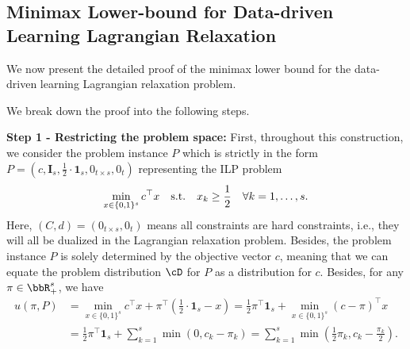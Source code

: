 \subsection{Minimax Lower-bound for Data-driven Learning Lagrangian Relaxation} \label{sec:app-minimax}

We now present the detailed proof of the minimax lower bound for the data-driven learning Lagrangian relaxation problem. 

    We break down the proof into the following steps. 
        
    \textbf{Step 1 - Restricting the problem space:} First, throughout this construction, we consider the problem instance $P$  which is strictly in the form $P = (c, \mathbf{I}_s, \frac{1}{2}\cdot \mathbf{1}_s, 0_{t \times s}, 0_t)$ representing the ILP problem
    \[
        \min_{x \in \{0, 1\}^s} c^\top x \quad \textup{s.t.} \quad x_k \geq \frac{1}{2} \quad \forall k = 1, \dots, s.
    \]
     Here, $(C, d) = (0_{t \times s}, 0_t)$ means all constraints are hard constraints, i.e., they will all be dualized in the Lagrangian relaxation problem. Besides, the problem instance $P$ is solely determined by the objective vector $c$, meaning that we can equate the problem distribution $\cD$ for $P$ as a distribution for $c$. Besides, for any $\pi \in \bbR^s_+$, we have
     \begin{equation*}
         \begin{aligned}
             u(\pi, P) &= \min_{x \in \{0, 1\}^s} c^\top x + \pi^\top (\frac{1}{2}\cdot \mathbf{1}_s - x)  = \frac{1}{2}\pi^\top \mathbf{1}_s + \min_{x \in \{0, 1\}^s}(c - \pi)^\top x  \\
            &= \frac{1}{2}\pi^\top \mathbf{1}_s + \sum_{k = 1}^s \min(0, c_k - \pi_k) = \sum_{k = 1}^s \min \left(\frac{1}{2}\pi_k, c_k - \frac{\pi_k}{2} \right).
         \end{aligned}
     \end{equation*}

